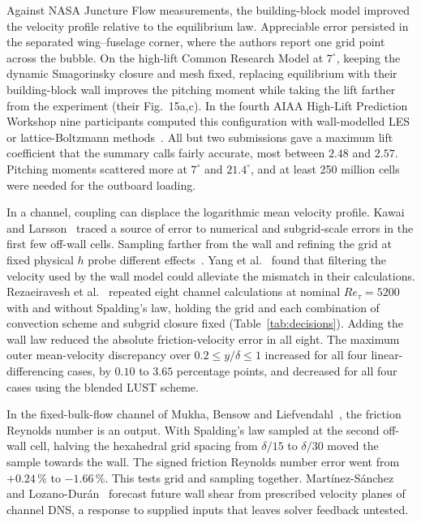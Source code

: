 \documentclass[pdflatex,sn-nature,iicol]{sn-jnl}
\begin{document}
Against NASA Juncture Flow measurements, the building-block model improved the velocity profile relative to the equilibrium law. Appreciable error persisted in the separated wing--fuselage corner, where the authors report one grid point across the bubble. On the high-lift Common Research Model at $7^\circ$, keeping the dynamic Smagorinsky closure and mesh fixed, replacing equilibrium with their building-block wall improves the pitching moment while taking the lift farther from the experiment (their Fig.~15a,c). In the fourth AIAA High-Lift Prediction Workshop nine participants computed this configuration with wall-modelled LES or lattice-Boltzmann methods~\cite{Kiris2023}. All but two submissions gave a maximum lift coefficient that the summary calls fairly accurate, most between $2.48$ and $2.57$. Pitching moments scattered more at $7^\circ$ and $21.4^\circ$, and at least 250 million cells were needed for the outboard loading.

In a channel, coupling can displace the logarithmic mean velocity profile. Kawai and Larsson~\cite{KawaiLarsson2012} traced a source of error to numerical and subgrid-scale errors in the first few off-wall cells. Sampling farther from the wall and refining the grid at fixed physical $h$ probe different effects~\cite{Larsson2016}. Yang et al.~\cite{YangParkMoin2017} found that filtering the velocity used by the wall model could alleviate the mismatch in their calculations. Rezaeiravesh et al.~\cite{Rezaeiravesh2019} repeated eight channel calculations at nominal $Re_\tau=5200$ with and without Spalding's law, holding the grid and each combination of convection scheme and subgrid closure fixed (Table~\ref{tab:decisions}). Adding the wall law reduced the absolute friction-velocity error in all eight. The maximum outer mean-velocity discrepancy over $0.2\le y/\delta\le1$ increased for all four linear-differencing cases, by $0.10$ to $3.65$ percentage points, and decreased for all four cases using the blended LUST scheme.

In the fixed-bulk-flow channel of Mukha, Bensow and Liefvendahl~\cite{MukhaBensow2021}, the friction Reynolds number is an output. With Spalding's law sampled at the second off-wall cell, halving the hexahedral grid spacing from $\delta/15$ to $\delta/30$ moved the sample towards the wall. The signed friction Reynolds number error went from $+0.24\,\%$ to $-1.66\,\%$. This tests grid and sampling together. Mart\'inez-S\'anchez and Lozano-Dur\'an~\cite{MartinezSanchez2026} forecast future wall shear from prescribed velocity planes of channel DNS, a response to supplied inputs that leaves solver feedback untested.
\end{document}

